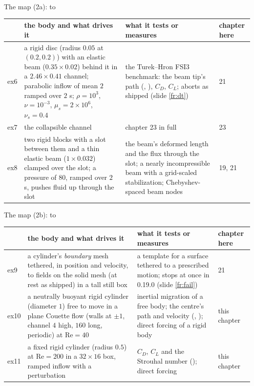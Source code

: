 \documentclass[aspectratio=169,11pt]{beamer}
\begin{document}
\begin{frame}{The map (2a):  to }
\label{fr:map2a}
\scriptsize
\setlength{\tabcolsep}{3pt}
\begin{tabular}{@{}L{0.05\textwidth}L{0.3\textwidth}L{0.3\textwidth}L{0.3\textwidth}@{}}
\toprule
& the body and what drives it & what it tests or measures & chapter here \\
\midrule
ex6 & a rigid disc (radius $0.05$ at $(0.2, 0.2)$) with an elastic beam ($0.35\times0.02$) behind it in a $2.46\times0.41$ channel; parabolic inflow of mean $2$ ramped over $2$ s; $\rho = 10^3$, $\nu = 10^{-3}$, $\mu_s = 2\times10^6$, $\nu_s = 0.4$ & the Turek--Hron FSI3 benchmark: the beam tip's path (, ), $C_D$, $C_L$; aborts as shipped (slide \ref{fr:dt}) & 21 \\
ex7 & the collapsible channel & chapter 23 in full & 23 \\
ex8 & two rigid blocks with a slot between them and a thin elastic beam ($1\times0.032$) clamped over the slot; a pressure of $80$, ramped over $2$ s, pushes fluid up through the slot & the beam's deformed length and the flux through the slot; a nearly incompressible beam with a grid-scaled stabilization; Chebyshev-spaced beam nodes & 19, 21 \\
\bottomrule
\end{tabular}
\end{frame}

\begin{frame}{The map (2b):  to }
\label{fr:map2}
\scriptsize
\setlength{\tabcolsep}{3pt}
\begin{tabular}{@{}L{0.05\textwidth}L{0.3\textwidth}L{0.3\textwidth}L{0.3\textwidth}@{}}
\toprule
& the body and what drives it & what it tests or measures & chapter here \\
\midrule
ex9 & a cylinder's \emph{boundary} mesh tethered, in position and velocity, to fields on the solid mesh (at rest as shipped) in a tall still box & a template for a surface tethered to a prescribed motion; stops at once in 0.19.0 (slide \ref{fr:fail}) & 21 \\
ex10 & a neutrally buoyant rigid cylinder (diameter $1$) free to move in a plane Couette flow (walls at $\pm1$, channel $4$ high, $160$ long, periodic) at $\mathrm{Re} = 40$ & inertial migration of a free body; the centre's path and velocity (, ); direct forcing of a rigid body & this chapter \\
ex11 & a fixed rigid cylinder (radius $0.5$) at $\mathrm{Re} = 200$ in a $32\times16$ box, ramped inflow with a perturbation & $C_D$, $C_L$ and the Strouhal number (); direct forcing & this chapter \\
\bottomrule
\end{tabular}
\end{frame}
\end{document}
